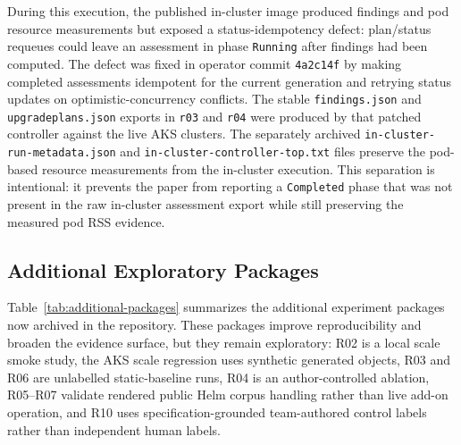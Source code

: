 \documentclass[10pt,journal]{IEEEtran}
\newcommand{\code}[1]{\texttt{#1}}
\begin{document}
During this execution, the published in-cluster image produced findings and pod resource measurements but exposed a status-idempotency defect: plan/status requeues could leave an assessment in phase \code{Running} after findings had been computed. The defect was fixed in operator commit \code{4a2c14f} by making completed assessments idempotent for the current generation and retrying status updates on optimistic-concurrency conflicts. The stable \code{findings.json} and \code{upgradeplans.json} exports in \code{r03} and \code{r04} were produced by that patched controller against the live AKS clusters. The separately archived \code{in-cluster-run-metadata.json} and \code{in-cluster-controller-top.txt} files preserve the pod-based resource measurements from the in-cluster execution. This separation is intentional: it prevents the paper from reporting a \code{Completed} phase that was not present in the raw in-cluster assessment export while still preserving the measured pod RSS evidence.

\subsection{Additional Exploratory Packages}
Table~\ref{tab:additional-packages} summarizes the additional experiment packages now archived in the repository. These packages improve reproducibility and broaden the evidence surface, but they remain exploratory: R02 is a local scale smoke study, the AKS scale regression uses synthetic generated objects, R03 and R06 are unlabelled static-baseline runs, R04 is an author-controlled ablation, R05--R07 validate rendered public Helm corpus handling rather than live add-on operation, and R10 uses specification-grounded team-authored control labels rather than independent human labels.
\end{document}

